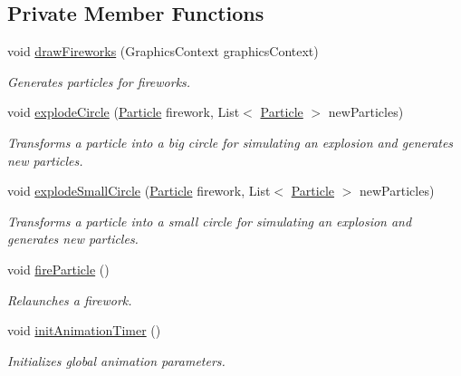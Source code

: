 \subsection*{Private Member Functions}
\begin{DoxyCompactItemize}
\item 
void \hyperlink{classbattleship2D_1_1ui_1_1Explosion_a4b196534a62cd03284da2db8e37578e8}{draw\-Fireworks} (Graphics\-Context graphics\-Context)
\begin{DoxyCompactList}\small\item\em Generates particles for fireworks. \end{DoxyCompactList}\item 
void \hyperlink{classbattleship2D_1_1ui_1_1Explosion_a3a9a50a352593bca18bf2d13bd8e3c4e}{explode\-Circle} (\hyperlink{classbattleship2D_1_1ui_1_1Particle}{Particle} firework, List$<$ \hyperlink{classbattleship2D_1_1ui_1_1Particle}{Particle} $>$ new\-Particles)
\begin{DoxyCompactList}\small\item\em Transforms a particle into a big circle for simulating an explosion and generates new particles. \end{DoxyCompactList}\item 
void \hyperlink{classbattleship2D_1_1ui_1_1Explosion_a0d2cbeaefac4ab21a5be6d088797a74a}{explode\-Small\-Circle} (\hyperlink{classbattleship2D_1_1ui_1_1Particle}{Particle} firework, List$<$ \hyperlink{classbattleship2D_1_1ui_1_1Particle}{Particle} $>$ new\-Particles)
\begin{DoxyCompactList}\small\item\em Transforms a particle into a small circle for simulating an explosion and generates new particles. \end{DoxyCompactList}\item 
void \hyperlink{classbattleship2D_1_1ui_1_1Explosion_a51c9ffdbf54c26e716f9f97a8c34eb94}{fire\-Particle} ()
\begin{DoxyCompactList}\small\item\em Relaunches a firework. \end{DoxyCompactList}\item 
void \hyperlink{classbattleship2D_1_1ui_1_1Explosion_aa6893749b2bd4e0cffb7603338e139b2}{init\-Animation\-Timer} ()
\begin{DoxyCompactList}\small\item\em Initializes global animation parameters. \end{DoxyCompactList}\item 

\end{DoxyCompactItemize}

